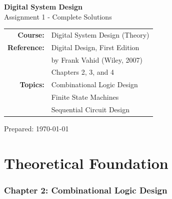 \documentclass[12pt,a4paper]{article}
\begin{document}
\begin{titlepage}
\centering
\vspace*{2cm}

{\Huge\bfseries\textcolor{headerblue}{Digital System Design}}\\[0.5cm]
{\LARGE Assignment 1 - Complete Solutions}\\[2cm]


\vspace{2cm}

\begin{tabular}{rl}
\textbf{Course:} & Digital System Design (Theory)\\[0.3cm]
\textbf{Reference:} & Digital Design, First Edition\\
& by Frank Vahid (Wiley, 2007)\\
& Chapters 2, 3, and 4\\[0.3cm]
\textbf{Topics:} & Combinational Logic Design\\
& Finite State Machines\\
& Sequential Circuit Design
\end{tabular}

\vfill

{\large Prepared: \today}

\end{titlepage}

\tableofcontents
\newpage

\part{Theoretical Foundation}
\section{Chapter 2: Combinational Logic Design}
\end{document}
